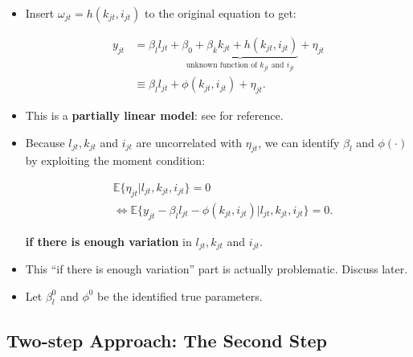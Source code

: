 \documentclass[]{book}
\providecommand{\tightlist}{%
  \setlength{\itemsep}{0pt}\setlength{\parskip}{0pt}}
\theoremstyle{definition}
\theoremstyle{definition}
\theoremstyle{definition}
\theoremstyle{remark}
\begin{document}
\begin{itemize}
\tightlist
\item
  Insert \(\omega_{jt} = h(k_{jt}, i_{jt})\) to the original equation to
  get:

  \begin{equation}
  \begin{split}
  y_{jt} &= \beta_l l_{jt} + \underbrace{\beta_0 + \beta_k k_{jt} + h(k_{jt}, i_{jt})}_{\text{unknown function of $k_{jt}$ and $i_{jt}$}} + \eta_{jt}\\
  & \equiv \beta_l l_{jt} + \phi(k_{jt}, i_{jt}) + \eta_{jt}.
  \end{split}
  \end{equation}
\item
  This is a \textbf{partially linear model}: see \citet{Ichimura2007}
  for reference.
\item
  Because \(l_{jt}, k_{jt}\) and \(i_{jt}\) are uncorrelated with
  \(\eta_{jt}\), we can identify \(\beta_l\) and \(\phi(\cdot)\) by
  exploiting the moment condition:

  \begin{equation}
  \begin{split}
  & \mathbb{E}\{\eta_{jt}|l_{jt}, k_{jt}, i_{jt}\} = 0\\
  & \Leftrightarrow \mathbb{E}\{y_{jt} - \beta_l l_{jt} - \phi(k_{jt}, i_{jt}) |l_{jt}, k_{jt}, i_{jt}\} = 0.
  \end{split}
  \end{equation}

  \textbf{if there is enough variation} in \(l_{jt}, k_{jt}\) and
  \(i_{jt}\).
\item
  This ``if there is enough variation'' part is actually problematic.
  Discuss later.
\item
  Let \(\beta_l^0\) and \(\phi^0\) be the identified true parameters.
\end{itemize}

\subsection{Two-step Approach: The Second
Step}\label{two-step-approach-the-second-step}
\end{document}
